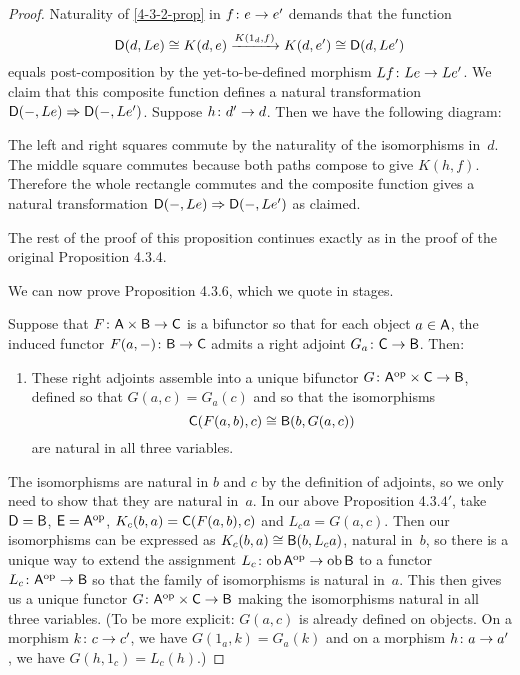 \documentclass[../../solutions]{subfiles}
\begin{document}
\begin{proof}
  Naturality of \eqref{4-3-2-prop} in ${f}\colon{e}\to{e'}$ demands that
  the function
  $${\mathsf{D}}(d,Le)\cong K(d,e) \xrightarrow{K(1_d,f)} K(d,e') \cong
  {\mathsf{D}}(d,Le')$$
  equals post-composition by the yet-to-be-defined morphism
  ${Lf}\colon{Le}\to{Le'}$.  We claim that this composite function defines
  a natural transformation ${\mathsf{D}}(-,Le)\Rightarrow {\mathsf{D}}(-,Le')$.  Suppose
  ${h}\colon{d'}\to{d}$.  Then we have the following diagram:
  \begin{center}
  \end{center}
  The left and right squares commute by the naturality of the
  isomorphisms in~$d$.  The middle square commutes because both paths
  compose to give $K(h,f)$.  Therefore the whole rectangle commutes
  and the composite function gives a natural transformation
  ${\mathsf{D}}(-,Le)\Rightarrow {\mathsf{D}}(-,Le')$ as claimed.

  The rest of the proof of this proposition continues exactly as in
  the proof of the original Proposition 4.3.4.

  We can now prove Proposition 4.3.6, which we quote in stages.

  \begin{proposition}
    Suppose that ${F}\colon{{\mathsf{A}}\times{\mathsf{B}}}\to{{\mathsf{C}}}$ is a bifunctor so that
    for each object $a\in{\mathsf{A}}$, the induced functor
    ${F(a,-)}\colon{{\mathsf{B}}}\to{{\mathsf{C}}}$ admits a right adjoint
    ${G_a}\colon{{\mathsf{C}}}\to{{\mathsf{B}}}$.  Then:
    \begin{enumerate}[label=(\roman*)]
    \item These right adjoints assemble into a unique bifunctor
      ${G}\colon{{\mathsf{A}}^{\mathrm{op}}\times{\mathsf{C}}}\to{{\mathsf{B}}}$, defined so that
      $G(a,c)=G_a(c)$ and so that the isomorphisms
      $${\mathsf{C}}(F(a,b),c)\cong{\mathsf{B}}(b,G(a,c))$$
      are natural in all three variables.
    \end{enumerate}
  \end{proposition}
  \popthm

  The isomorphisms are natural in $b$ and $c$ by the definition of
  adjoints, so we only need to show that they are natural in~$a$.  In
  our above Proposition 4.3.$4'$, take ${\mathsf{D}}={\mathsf{B}}$,
  ${\mathsf{E}}={\mathsf{A}}^{\mathrm{op}}$, $K_c(b,a)={\mathsf{C}}(F(a,b),c)$ and $L_ca=G(a,c)$.  Then our
  isomorphisms can be expressed as $K_c(b,a)\cong {\mathsf{B}}(b,L_ca)$,
  natural in~$b$, so there is a unique way to extend the assignment
  ${L_c}\colon{\operatorname{ob}{\mathsf{A}}^{\mathrm{op}}}\to{\operatorname{ob}{\mathsf{B}}}$ to a functor
  ${L_c}\colon{{\mathsf{A}}^{\mathrm{op}}}\to{{\mathsf{B}}}$ so that the family of isomorphisms is
  natural in~$a$.  This then gives us a unique functor
  ${G}\colon{{\mathsf{A}}^{\mathrm{op}}\times{\mathsf{C}}}\to{{\mathsf{B}}}$ making the isomorphisms natural in
  all three variables.  (To be more explicit: $G(a,c)$ is already
  defined on objects.  On a morphism ${k}\colon{c}\to{c'}$, we have
  $G(1_a,k)=G_a(k)$ and on a morphism ${h}\colon{a}\to{a'}$, we have
  $G(h,1_c)=L_c(h)$.)


\end{proof}
\end{document}
